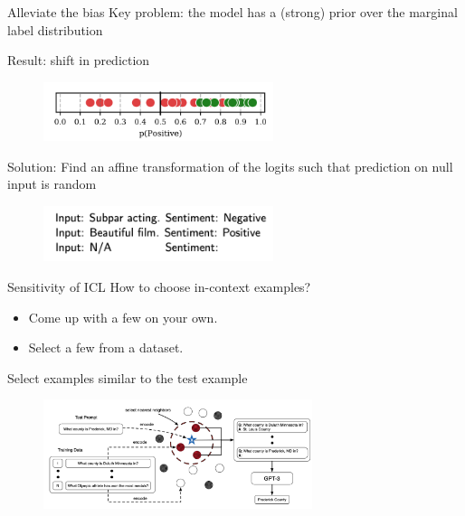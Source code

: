 \documentclass[usenames,dvipsnames,notes,11pt,aspectratio=169,hyperref={colorlinks=true, linkcolor=blue}]{beamer}
\begin{document}
\begin{frame}
    {Alleviate the bias}{}
    Key problem: the model has a (strong) prior over the marginal label distribution

    Result: shift in prediction\\[-1ex]
    \begin{figure}
        \includegraphics[width=0.6\textwidth]{figures/calibrate}
    \end{figure}

    Solution: \pause
    Find an affine transformation of the logits such that prediction on null input is random\\[-1em]
    \begin{figure}
        \includegraphics[width=0.6\textwidth]{figures/calibrate-ex}
    \end{figure}
\end{frame}

\begin{frame}
    {Sensitivity of ICL}{}
    How to choose in-context examples?\\
    \begin{itemize}
    \item Come up with a few on your own.
    \item Select a few from a dataset.
    \end{itemize}

    Select examples similar to the test example \mycite{[Liu et al., 2021]}
    \begin{figure}
        \includegraphics[width=0.7\textwidth]{figures/knn-select}
    \end{figure}
\end{frame}
\end{document}

